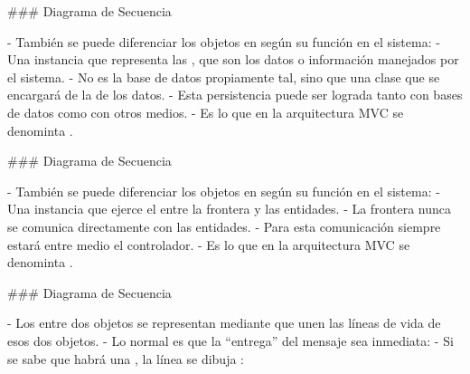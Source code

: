 ### Diagrama de Secuencia


- También se puede diferenciar los objetos en según su función en el sistema:
    - Una instancia que representa las , que son los datos o información manejados por el sistema.
    - No es la base de datos propiamente tal, sino que una clase que se encargará de la
     de los datos.
        - Esta persistencia puede ser lograda tanto con bases de datos como con otros medios.
        - Es lo que en la arquitectura MVC se denominta .

### Diagrama de Secuencia


- También se puede diferenciar los objetos en según su función en el sistema:
    - Una instancia que ejerce el  entre la frontera y las entidades.
    - La frontera nunca se comunica directamente con las entidades.
        - Para esta comunicación siempre estará entre medio el controlador.
        - Es lo que en la arquitectura MVC se denominta .

### Diagrama de Secuencia


- Los  entre dos objetos se representan mediante  que unen las líneas de
vida de esos dos objetos.
    - Lo normal es que la ``entrega'' del mensaje sea inmediata:
\vspace{0.5em}
    - Si se sabe que habrá una , la línea se dibuja :
\vspace{0.5em}

